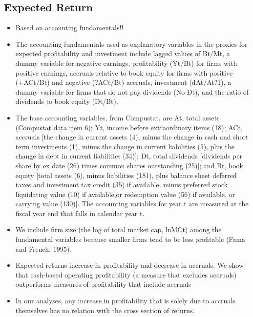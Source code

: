 \documentclass[12pt]{article}
\begin{document}
\subsection{Expected Return}    

    \begin{itemize}

        \item Based on accounting fundamentals!! 

        \item The accounting fundamentals used as explanatory variables in the proxies for expected profitability and investment include lagged values of Bt/Mt, a dummy variable for negative earnings, profitability (Yt/Bt) for firms with positive earnings, accruals relative to book
        equity for firms with positive (+ACt/Bt) and negative (?ACt/Bt) accruals, investment (dAt/At?1), a dummy variable for firms that do not pay dividends (No Dt), and the ratio of dividends to book equity (Dt/Bt).\citep{Fama2006}

        \item The base accounting variables, from Compustat, are At, total assets (Compustat data item 6); Yt, income before extraordinary items (18); ACt, accruals [the change in current assets (4), minus the change in cash and short term investments (1), minus the change in current liabilities (5), plus the change in debt in current liabilities (34)]; Dt, total dividends [dividends per share by ex date (26) times common shares outstanding (25)]; and Bt, book equity  [total assets (6), minus liabilities (181), plus balance sheet deferred taxes and investment tax credit (35) if available, minus preferred stock liquidating value (10) if available,or redemption value (56) if available, or carrying value (130)]. The accounting variables for year t are measured at the fiscal year end that falls in calendar year t. \citep{Fama2006}

        \item We include firm size (the log of total market cap, lnMCt) among the fundamental variables because smaller firms tend to be less profitable (Fama and French, 1995).\citep{Fama2006}

        \item Expected returns increase in profitability and decrease in accruals. We show that cash-based operating profitability (a measure that excludes accruals) outperforms measures of profitability that include accruals \citep{Ball2016}

        \item In our analyses, any increase in profitability that is solely due to accruals themselves has no relation with the cross section of returns.\citep{Ball2016}


\end{itemize}
\end{document}
